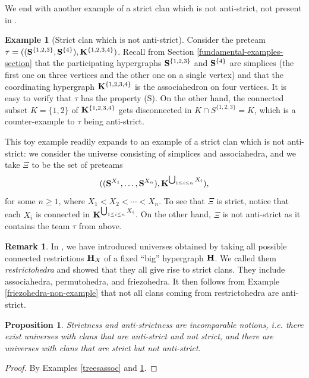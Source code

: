 \documentclass{article}
\theoremstyle{plain}
\newtheorem{proposition}[thm]{Proposition}
\theoremstyle{definition}
\newtheorem{remark}[thm]{Remark}
\newtheorem{example}[thm]{\sc Example}
\newcommand{\set}[1]{\{#1\}}
\newcommand{\hyper}[1]{{\bf #1}}
\begin{document}
We end with another example of a strict clan which is not anti-strict, not present in \cite{PLBJ1}.
\begin{example}[Strict clan which is not anti-strict]\label{strict-not-antistrict}
Consider the preteam $\tau=(({\bf S}^{\{1,2,3\}},{\bf S}^{\set{4}}),{\bf K}^{\{1,2,3,4\}})$. Recall from Section \ref{fundamental-examples-section} that the  participating hypergraphs ${\bf S}^{\{1,2,3\}}$ and ${\bf S}^{\set{4}}$ are simplices  (the first one on three vertices and  the other one on a single vertex) and that the coordinating hypergraph ${\bf K}^{\{1,2,3,4\}}$ is the associahedron on four vertices.   It is easy to verify that $\tau$ has the  property (S). On the other hand, the connected subset $K=\{1,2\}$ of  ${\bf K}^{\{1,2,3,4\}}$ gets disconnected in $K\cap {S}^{\{1,2,3\}}=K$, which is a counter-example to $\tau$ being anti-strict.

This toy example readily expands to an example of a strict clan which is not anti-strict: we consider the universe consisting of simplices and associahedra, and we  take $\Xi$  to be the set of   preteams $$(({\bf S}^{X_1},\dots,{\bf S}^{X_n}),{\bf K}^{\bigcup_{1\leq i\leq n} X_i}),$$ for some $n\geq 1$, where $X_1<X_2<\cdots < X_n$. To see that $\Xi$ is strict, notice that each $X_i$ is connected in ${\bf K}^{\bigcup_{1\leq i\leq n} X_i}$. On the other hand, $\Xi$ is not anti-strict as it contains the team $\tau$ from above.
\end{example}


\begin{remark}\label{restrictohedra-remark}
In  \cite{PLBJ1}, we have introduced universes obtained by taking all possible connected restrictions $\hyper{H}_X$ of a fixed ``big'' hypergraph $\hyper{H}$. We called them \emph{restrictohedra} and showed that they all give rise to strict clans. They include associahedra, permutohedra, and friezohedra.  It then follows from Example \ref{friezohedra-non-example} that
not all clans coming from restrictohedra are anti-strict.
\end{remark}

\begin{proposition} 
Strictness and  anti-strictness are incomparable notions, i.e. there exist universes with clans that are anti-strict and not strict, and there are universes with clans that are strict but not anti-strict.
\end{proposition}
\begin{proof}
By Examples \ref{treesassoc} and \ref{strict-not-antistrict}.
\end{proof}
\end{document}
